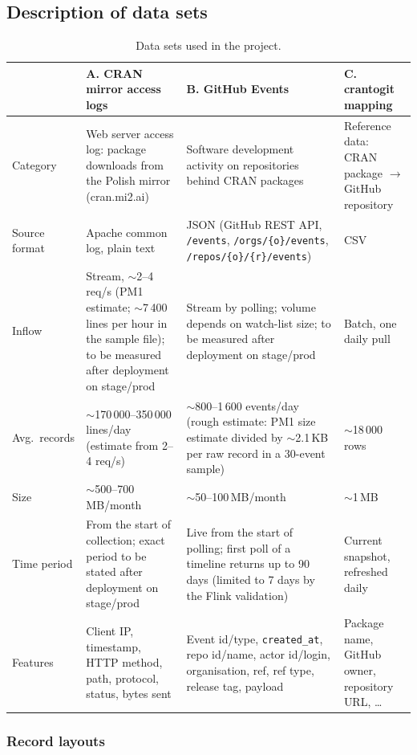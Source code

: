\documentclass[11pt,a4paper]{article}
\begin{document}
\subsection{Description of data sets}

\begin{table}[H]
\centering
\caption{Data sets used in the project.}
\scriptsize
\begin{tabularx}{\textwidth}{@{}L{2.0cm}YYY@{}}
\toprule
 & \textbf{A. CRAN mirror access logs} & \textbf{B. GitHub Events} & \textbf{C. crantogit mapping} \\
\midrule
Category & Web server access log: package downloads from the Polish mirror (cran.mi2.ai) &
  Software development activity on repositories behind CRAN packages &
  Reference data: CRAN package $\to$ GitHub repository \\
Source format & Apache common log, plain text &
  JSON (GitHub REST API, \texttt{/events}, \texttt{/orgs/\{o\}/events}, \texttt{/repos/\{o\}/\{r\}/events}) &
  CSV \\
Inflow & Stream, $\sim$2--4 req/s (PM1 estimate; $\sim$7\,400 lines per hour in the sample file); to be measured after deployment on stage/prod &
  Stream by polling; volume depends on watch-list size; to be measured after deployment on stage/prod &
  Batch, one daily pull \\
Avg.\ records & $\sim$170\,000--350\,000 lines/day (estimate from 2--4 req/s) &
  $\sim$800--1\,600 events/day (rough estimate: PM1 size estimate divided by $\sim$2.1\,KB per raw record in a 30-event sample) &
  $\sim$18\,000 rows \\
Size & $\sim$500--700\,MB/month & $\sim$50--100\,MB/month & $\sim$1\,MB \\
Time period & From the start of collection; exact period to be stated after deployment on stage/prod &
  Live from the start of polling; first poll of a timeline returns up to 90 days (limited to 7 days by the Flink validation) &
  Current snapshot, refreshed daily \\
Features & Client IP, timestamp, HTTP method, path, protocol, status, bytes sent &
  Event id/type, \texttt{created\_\allowbreak{}at}, repo id/name, actor id/login, organisation, ref, ref type, release tag, payload &
  Package name, GitHub owner, repository URL, \ldots \\
\bottomrule
\end{tabularx}
\end{table}

\subsubsection{Record layouts}
\end{document}
